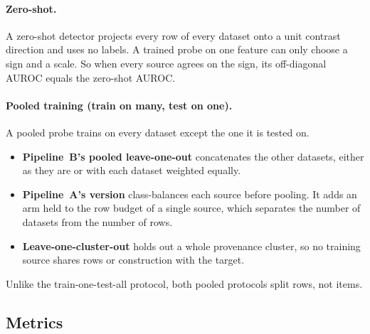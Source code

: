 \paragraph{Zero-shot.} A zero-shot detector projects every row of every dataset onto a unit contrast direction and uses no labels. %
A trained probe on one feature can only choose a sign and a scale. So when every source agrees on the sign, its off-diagonal AUROC equals the zero-shot AUROC. %

\paragraph{Pooled training (train on many, test on one).} A pooled probe trains on every dataset except the one it is tested on.
\begin{itemize}
\item \textbf{Pipeline~B's pooled leave-one-out} concatenates the other datasets, either as they are or with each dataset weighted equally. %
\item \textbf{Pipeline~A's version} class-balances each source before pooling. %
It adds an arm held to the row budget of a single source, which separates the number of datasets from the number of rows. %
\item \textbf{Leave-one-cluster-out} holds out a whole provenance cluster, so no training source shares rows or construction with the target. %
\end{itemize}
Unlike the train-one-test-all protocol, both pooled protocols split rows, not items. %

\subsection{Metrics}
\label{sec:m-metrics}

